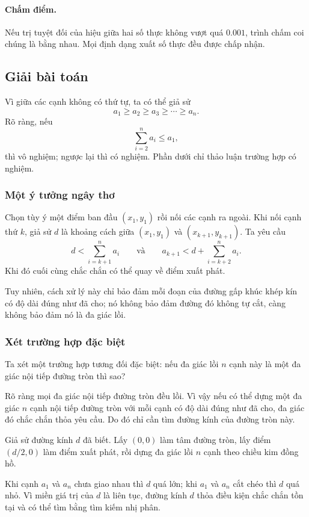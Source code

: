 \documentclass[11pt]{article}
\begin{document}
\paragraph{Chấm điểm.}
Nếu trị tuyệt đối của hiệu giữa hai số thực không vượt quá \(0.001\), trình
chấm coi chúng là bằng nhau. Mọi định dạng xuất số thực đều được chấp nhận.

\subsection{Giải bài toán}

Vì giữa các cạnh không có thứ tự, ta có thể giả sử
\[
  a_1\ge a_2\ge a_3\ge\cdots\ge a_n.
\]
Rõ ràng, nếu
\[
  \sum_{i=2}^{n} a_i\le a_1,
\]
thì vô nghiệm; ngược lại thì có nghiệm. Phần dưới chỉ thảo luận trường hợp có
nghiệm.

\subsubsection{Một ý tưởng ngây thơ}

Chọn tùy ý một điểm ban đầu \((x_1,y_1)\) rồi nối các cạnh ra ngoài. Khi nối
cạnh thứ \(k\), giả sử \(d\) là khoảng cách giữa \((x_1,y_1)\) và
\((x_{k+1},y_{k+1})\). Ta yêu cầu
\[
  d<\sum_{i=k+1}^{n} a_i
  \qquad\text{và}\qquad
  a_{k+1}<d+\sum_{i=k+2}^{n} a_i.
\]
Khi đó cuối cùng chắc chắn có thể quay về điểm xuất phát.

Tuy nhiên, cách xử lý này chỉ bảo đảm mỗi đoạn của đường gấp khúc khép kín có
độ dài đúng như đã cho; nó không bảo đảm đường đó không tự cắt, càng không bảo
đảm nó là đa giác lồi.

\subsubsection{Xét trường hợp đặc biệt}

Ta xét một trường hợp tương đối đặc biệt: nếu đa giác lồi \(n\) cạnh này là
một đa giác nội tiếp đường tròn thì sao?

Rõ ràng mọi đa giác nội tiếp đường tròn đều lồi. Vì vậy nếu có thể dựng một
đa giác \(n\) cạnh nội tiếp đường tròn với mỗi cạnh có độ dài đúng như đã cho,
đa giác đó chắc chắn thỏa yêu cầu. Do đó chỉ cần tìm đường kính của đường tròn
này.

Giả sử đường kính \(d\) đã biết. Lấy \((0,0)\) làm tâm đường tròn, lấy điểm
\((d/2,0)\) làm điểm xuất phát, rồi dựng đa giác lồi \(n\) cạnh theo chiều kim
đồng hồ.

Khi cạnh \(a_1\) và \(a_n\) chưa giao nhau thì \(d\) quá lớn; khi \(a_1\) và
\(a_n\) cắt chéo thì \(d\) quá nhỏ. Vì miền giá trị của \(d\) là liên tục,
đường kính \(d\) thỏa điều kiện chắc chắn tồn tại và có thể tìm bằng tìm kiếm
nhị phân.
\end{document}
